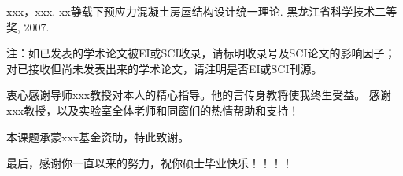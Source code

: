 \documentclass[a4paper, twoside, openany]{NCEPUMaster_Original}
\begin{document}
\begin{achievementlist}
\item[ {[1]} ]
xxx，xxx. xx静载下预应力混凝土房屋结构设计统一理论. 黑龙江省科学技术二等奖, 2007.
\end{achievementlist}

注：如已发表的学术论文被EI或SCI收录，请标明收录号及SCI论文的影响因子；对已接收但尚未发表出来的学术论文，请注明是否EI或SCI刊源。

衷心感谢导师xxx教授对本人的精心指导。他的言传身教将使我终生受益。
感谢xxx教授，以及实验室全体老师和同窗们的热情帮助和支持！

本课题承蒙xxx基金资助，特此致谢。

最后，感谢你一直以来的努力，祝你硕士毕业快乐！！！！
\end{document}
